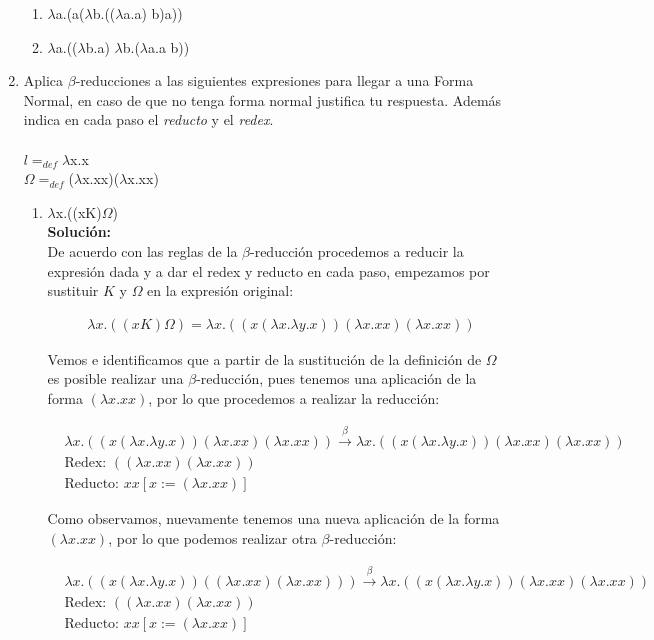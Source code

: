\documentclass[11pt]{article}
\begin{document}
\begin{enumerate}[leftmargin=0.8cm]
\begin{enumerate}
        \item $\lambda$a.(a($\lambda$b.(($\lambda$a.a) b)a))
        \item $\lambda$a.(($\lambda$b.a) $\lambda$b.($\lambda$a.a b))
    \end{enumerate}
    \item Aplica $\beta$-reducciones a las siguientes expresiones para llegar a una Forma Normal, en caso de que no tenga forma normal justifica tu respuesta. Además indica en cada paso el \textit{reducto} y el \textit{redex}.\\
    \\
    $l = _{def}\lambda$x.x\\
    $\Omega = _{def}$($\lambda$x.xx)($\lambda$x.xx)
    \begin{enumerate}
        \item $\lambda$x.((xK)$\Omega$)\\
        \textbf{Solución:}\\
        De acuerdo con las reglas de la $\beta$-reducción procedemos a reducir la expresión dada y a dar el redex y reducto en cada paso, empezamos por sustituir $K$ y $\Omega$ en la expresión original:

        \begin{align*}
            & \lambda x.((xK)\Omega)= \lambda x. ((x(\lambda x.\lambda y.x)) (\lambda x.xx) (\lambda x.xx))
        \end{align*}

        Vemos e identificamos que a partir de la sustitución de la definición de $\Omega$ es posible realizar una $\beta$-reducción, pues tenemos una aplicación de la forma $(\lambda x.xx)$, por lo que procedemos a realizar la reducción:

        \begin{align*}
            & \lambda x.((x(\lambda x.\lambda y.x)) (\lambda x.xx) (\lambda x.xx)) \xrightarrow{\beta} \lambda x.((x(\lambda x.\lambda y.x)) (\lambda x.xx)(\lambda x.xx))\\
            & \text{Redex: } ((\lambda x.xx)(\lambda x.xx))\\
            & \text{Reducto: } xx[x:= (\lambda x.xx)]
        \end{align*} 

        Como observamos, nuevamente tenemos una nueva aplicación de la forma $(\lambda x.xx)$, por lo que podemos realizar otra $\beta$-reducción:

        \begin{align*}
            & \lambda x.((x(\lambda x.\lambda y.x)) ((\lambda x.xx)(\lambda x.xx)))\xrightarrow{\beta} \lambda x.((x(\lambda x.\lambda y.x)) (\lambda x.xx)(\lambda x.xx))\\
            & \text{Redex: } ((\lambda x.xx)(\lambda x.xx))\\
            & \text{Reducto: } xx[x:= (\lambda x.xx)] 
        \end{align*}


\end{enumerate}
\end{enumerate}
\end{document}
